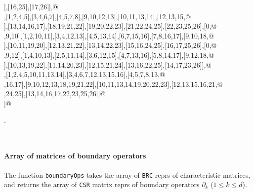 \documentclass[11pt,oneside]{article}	%
\begin{document}
\begin{flushleft}
\begin{minipage}{\linewidth}
\begin{list}{}{}
\mbox{}],[16,25],[17,26]],@\\
\mbox{}\verb@[[0,1,3,4],[1,2,4,5],[3,4,6,7],[4,5,7,8],[9,10,12,13],[10,11,13,14],[12,13,15,@\\
\mbox{}],[13,14,16,17],[18,19,21,22],[19,20,22,23],[21,22,24,25],[22,23,25,26],[0,@\\
\mbox{},9,10],[1,2,10,11],[3,4,12,13],[4,5,13,14],[6,7,15,16],[7,8,16,17],[9,10,18,@\\
\mbox{}],[10,11,19,20],[12,13,21,22],[13,14,22,23],[15,16,24,25],[16,17,25,26],[0,@\\
\mbox{},9,12],[1,4,10,13],[2,5,11,14],[3,6,12,15],[4,7,13,16],[5,8,14,17],[9,12,18,@\\
\mbox{}],[10,13,19,22],[11,14,20,23],[12,15,21,24],[13,16,22,25],[14,17,23,26]],@\\
\mbox{}\verb@[[0,1,3,4,9,10,12,13],[1,2,4,5,10,11,13,14],[3,4,6,7,12,13,15,16],[4,5,7,8,13,@\\
\mbox{},16,17],[9,10,12,13,18,19,21,22],[10,11,13,14,19,20,22,23],[12,13,15,16,21,@\\
\mbox{},24,25],[13,14,16,17,22,23,25,26]]@\\
\mbox{}\verb@]@\\
\mbox{}\verb@@{\NWsep}
\end{list}
\vspace{-1ex}
\footnotesize\addtolength{\baselineskip}{-1ex}
\begin{list}{}{\setlength{\itemsep}{-\parsep}\setlength{\itemindent}{-\leftmargin}}
\item {\NWtxtMacroNoRef}.
\end{list}
\end{minipage}\\[4ex]
\end{flushleft}


\paragraph{Array of matrices of boundary operators}

The function \texttt{boundaryOps} takes the array of \texttt{BRC} reprs of characteristic matrices, and returns the array of \texttt{CSR} matrix reprs of boundary operators $\partial_k$ ($1\leq k\leq d$).
\end{document}
